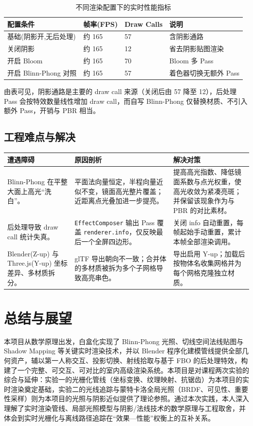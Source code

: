 \documentclass[11pt, a4paper, oneside]{report}
\newcommand{\code}[1]{\texttt{#1}}
\begin{document}
\begin{table}[H]
\centering
\caption{不同渲染配置下的实时性能指标}
\label{tab:perf}
\begin{tabular}{p{4cm} p{2.5cm} p{2.5cm} p{3cm}}
\toprule
\textbf{配置条件} & \textbf{帧率(FPS)} & \textbf{Draw Calls} & \textbf{说明} \\
\midrule
基础(阴影开,无后处理) & 约 165 & 57 & 含阴影通路 \\
关闭阴影 & 约 165 & 12 & 省去阴影贴图渲染 \\
开启 Bloom & 约 165 & 70 & Bloom 多 Pass \\
开启 Blinn-Phong 对照 & 约 165 & 57 & 着色器切换无额外 Pass \\
\bottomrule
\end{tabular}
\end{table}
由表可见，阴影通路是主要的 draw call 来源（关闭后由 57 降至 12），后处理 Pass 会按特效数量线性增加 draw call，而自写 Blinn-Phong 仅替换材质、不引入额外 Pass，开销与 PBR 相当。

\section{工程难点与解决}
\begin{longtable}{|p{}|p{}|p{}|}
\hline
\textbf{遭遇障碍} & \textbf{原因剖析} & \textbf{解决对策} \\
\hline
\endhead
Blinn-Phong 在平整大面上高光“洗白”。 & 平面法向量恒定，半程向量近似不变，镜面高光整片覆盖；近距离点光叠加进一步提亮。 & 提高高光指数、降低镜面系数与点光权重，使高光收敛为紧凑亮斑；并保留该现象作为与 PBR 的对比素材。 \\
\hline
后处理导致 draw call 统计失真。 & \code{EffectComposer} 输出 Pass 覆盖 \code{renderer.info}，仅反映最后一个全屏四边形。 & 关闭 info 自动重置，每帧起始手动重置，累计本帧全部渲染调用。 \\
\hline
Blender(Z-up) 与 Three.js(Y-up) 坐标差异、多材质拆分。 & glTF 导出朝向不一致；合并体的多材质被拆为多个子网格导致高亮串色。 & 导出启用 Y-up；加载后按物体名收集网格并为每个网格克隆独立材质。 \\
\hline
\end{longtable}

\chapter{总结与展望}
本项目从数学原理出发，白盒化实现了 Blinn-Phong 光照、切线空间法线贴图与 Shadow Mapping 等关键实时渲染技术，并以 Blender 程序化建模管线提供全部几何资产，辅以第一人称交互、投影切换、射线拾取与基于 FBO 的后处理特效，构建了一个完整、可交互、可对比的室内高级渲染系统。本项目是对课程两次实验的综合与延伸：实验一的光栅化管线（坐标变换、纹理映射、抗锯齿）为本项目的实时渲染奠定基础，实验二的光线追踪与蒙特卡洛全局光照（BRDF、可见性、重要性采样）则为本项目的光照与阴影近似提供了理论参照。通过本次实践，本人深入理解了实时渲染管线、局部光照模型与阴影/法线技术的数学原理与工程取舍，并体会到实时光栅化与离线路径追踪在“效果—性能”权衡上的互补关系。
\end{document}
